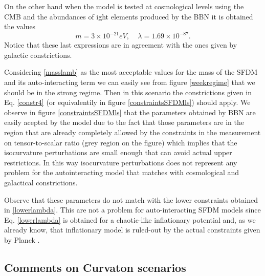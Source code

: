 \documentclass[amssymb,twocolumn,prd,nofootinbib,showpacs]{revtex4-1}
\begin{document}
On the other hand when the model is tested at cosmological levels using the CMB and the abundances of ight elements produced by the BBN it is obtained the values \cite{SFphi41,SFphi42}
\begin{equation}\label{masslamb}
m=3\times 10^{-21}eV, \ \ \ \ \ \lambda = 1.69\times 10^{-87}.
\end{equation}
Notice that these last expressions are in agreement with the ones given by galactic constrictions.

Considering \eqref{masslamb} as the most acceptable values for the mass of the SFDM and its auto-interacting term we can easily see from figure \ref{weekregime} that we should be in the strong regime. Then in this scenario the constrictions given in Eq. \eqref{constr4} (or equivalentily in figure \ref{constraintsSFDMls}) should apply. We observe in figure \ref{constraintsSFDMls} that the parameters obtained by BBN are easily acepted by the model due to the fact that those parameters are in the region that are already completely allowed by the constraints in the measurement on tensor-to-scalar ratio (grey region on the figure) which implies that the isocurvature perturbations are small enough that can avoid actual upper restrictions. In this way isocurvature perturbations does not represent any problem for the autointeracting model that matches with cosmological and galactical constrictions.

Observe that these parameters do not match with the lower constraints obtained in \eqref{lowerlambda}. This are not a problem for auto-interacting SFDM models since Eq. \eqref{lowerlambda} is obtained for a chaotic-like inflationary potential and, as we already know, that inflationary model is ruled-out by the actual constraints given by Planck \cite{planck}.

\subsection{Comments on Curvaton scenarios}
\end{document}
